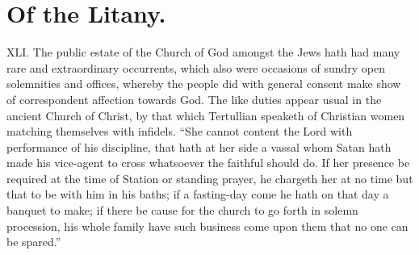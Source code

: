 \section*{Of the Litany.}
XLI. The public estate of the Church of God amongst the Jews hath had many rare and extraordinary occurrents, which also were occasions of sundry open solemnities and offices, whereby the people did with general consent make show of correspondent affection towards God. The like duties appear usual in the ancient Church of Christ, by that which Tertullian speaketh of Christian women matching themselves with infidels. “She cannot content the Lord with performance of his discipline, that hath at her side a vassal whom Satan hath made his vice-agent to cross whatsoever the faithful should do. If her presence be required at the time of Station or standing prayer, he chargeth her at no time  but that to be with him in his baths; if a fasting-day come he hath on that day a banquet to make; if there be cause for the church to go forth in solemn procession, his whole family have such business come upon them that no one can be spared.”
